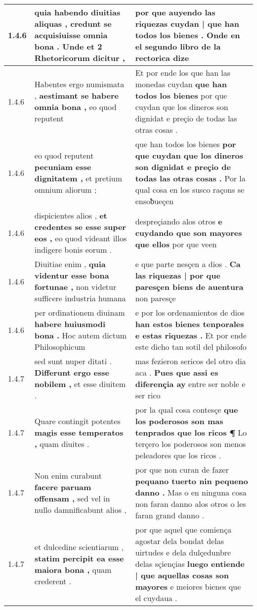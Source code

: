 \begin{tabular}{|p{1cm}|p{6.5cm}|p{6.5cm}|}
1.4.6 & quia habendo diuitias aliquas , \textbf{ credunt se acquisiuisse omnia bona . } Unde et 2 Rhetoricorum dicitur , & por que auyendo las riquezas \textbf{ cuydan | que han todos los bienes . } Onde en el segundo libro de la rectorica dize \\\hline
1.4.6 & Habentes ergo numismata , \textbf{ aestimant se habere omnia bona , } eo quod reputent & Et por ende los que han las monedas cuydan \textbf{ que han todos los bienes } por que cuydan que los dineros son dignidat e preçio de todas las otras cosas . \\\hline
1.4.6 & eo quod reputent \textbf{ pecuniam esse dignitatem , } et pretium omnium aliorum ; & que han todos los bienes \textbf{ por que cuydan que los dineros son dignidat e preçio de todas las otras cosas . } Por la qual cosa en los susco raçons se ensoƀueçen \\\hline
1.4.6 & dispicientes alios , \textbf{ et credentes se esse super eos , } eo quod videant illos indigere bonis eorum . & despreçiando alos otros \textbf{ e cuydando que son mayores que ellos } por que veen \\\hline
1.4.6 & Diuitiae enim , \textbf{ quia videntur esse bona fortunae , } non videtur sufficere industria humana & e que parte nesçen a dios . \textbf{ Ca las riquezas | por que paresçen biens de auentura } non paresçe \\\hline
1.4.6 & per ordinationem diuinam \textbf{ habere huiusmodi bona . } Hoc autem dictum Philosophicum & e por los ordenamientos de dios \textbf{ han estos bienes tenporales e estas riquezas . } Et por ende este dicho tan sotil del philosofo \\\hline
1.4.7 & sed sunt nuper ditati . \textbf{ Differunt ergo esse nobilem , } et esse diuitem . & mas fezieron sericos del otro dia aca . \textbf{ Pues que assi es diferençia ay } entre ser noble e ser rico \\\hline
1.4.7 & Quare contingit potentes \textbf{ magis esse temperatos , } quam diuites . & por la qual cosa contesçe \textbf{ que los poderosos son mas tenprados que los ricos ¶ } Lo terçero los poderosos son menos peleadores que los ricos . \\\hline
1.4.7 & Non enim curabunt \textbf{ facere paruam offensam , } sed vel in nullo damnificabunt alios , & por que non curan de fazer \textbf{ pequano tuerto nin pequeno danno . } Mas o en ninguna cosa non faran danno alos otros o les faran grand danno . \\\hline
1.4.7 & et dulcedine scientiarum , \textbf{ statim percipit ea esse maiora bona , } quam crederent . & por que aquel que comiença agostar dela bondat delas uirtudes e dela dulçedunbre delas sçiençias \textbf{ luego entiende | que aquellas cosas son mayores } e meiores bienes que el cuydaua . \\\hline

\end{tabular}
